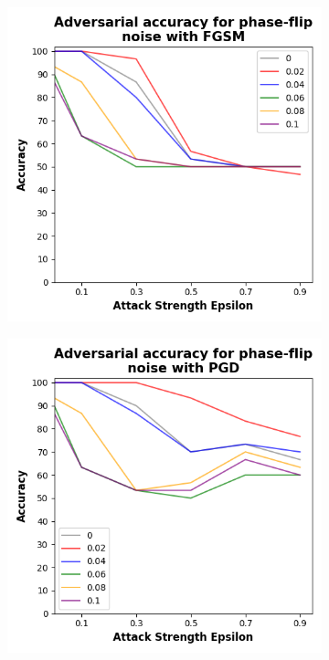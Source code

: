 \begin{figure}[!h]
  \centering

  \begin{subfigure}{0.45\textwidth}
      \includegraphics[width=\linewidth]{figures/evaluation_results/iris/pqc/figures/phase-flip-fgsm.png}
      \label{fig:iris15}
  \end{subfigure} \qquad
  \begin{subfigure}{0.45\textwidth}
      \includegraphics[width=\linewidth]{figures/evaluation_results/iris/pqc/figures/phase-flip-pgd.png}
      \label{fig:iris16}
  \end{subfigure}


\end{figure}
